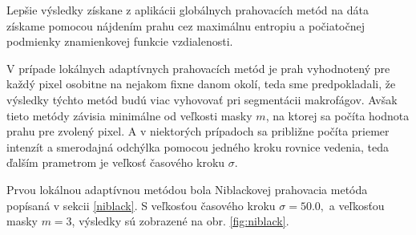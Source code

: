 \documentclass[a4paper,11pt,oneside]{article}%
\begin{document}
Lepšie výsledky získane z aplikácii globálnych prahovacích metód na dáta získame pomocou nájdením prahu cez maximálnu entropiu a počiatočnej podmienky znamienkovej funkcie vzdialenosti.

V prípade lokálnych adaptívnych prahovacích metód je prah vyhodnotený pre každý pixel osobitne na nejakom fixne danom okolí, teda sme predpokladali, že výsledky týchto metód budú viac vyhovovať pri segmentácii makrofágov. Avšak tieto metódy závisia minimálne od veľkosti masky $m$, na ktorej sa počíta hodnota prahu pre zvolený pixel. A v niektorých prípadoch sa približne počíta priemer intenzít a smerodajná odchýlka pomocou jedného kroku rovnice vedenia, teda ďalším prametrom je veľkosť časového kroku $\sigma$. 

Prvou lokálnou adaptívnou metódou bola Niblackovej prahovacia metóda popísaná v sekcii \ref{niblack}.  S veľkosťou časového kroku $\sigma = 50.0,$ a veľkosťou masky $m = 3$, výsledky sú zobrazené na obr. \ref{fig:niblack}. 
\end{document}
